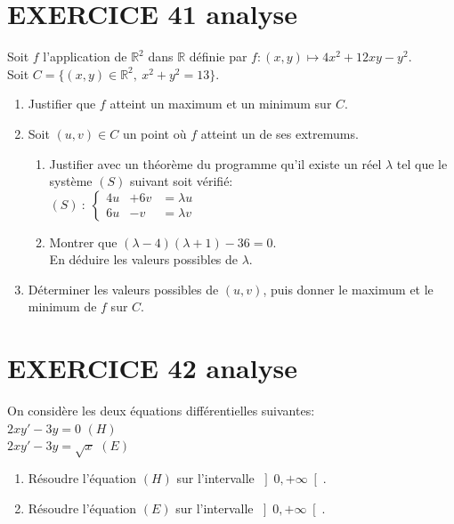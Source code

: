 \documentclass[10pt,oneside]{article}
\begin{document}
\begin{flushleft}
\begin{enumerate}
\end{enumerate}





\section*{EXERCICE 41 \:analyse }

Soit $f$ l'application de $\mathbb{R}^2$ dans $\mathbb{R}$ d\'efinie par $f:(x,y)\mapsto 4x^2+12xy-y^2$. \\
\medskip
Soit $C=\{(x,y)\in\mathbb{R}^2,\ x^2+y^2=13\}$.

\medskip

\begin{enumerate}
\item
Justifier que $f$ atteint un maximum et un minimum sur $C$.
\item
Soit $(u,v)\in C$ un point o\`u $f$ atteint un de ses extremums.
\begin{enumerate}
\item
Justifier avec un th\'eor\`eme du programme qu'il existe un r\'eel $\lambda$ tel que le syst\`eme $(S)$ suivant soit v\'erifi\'e:\\
$(S)\ :\ \left\{\begin{array}{lll}4u&+6v&=\lambda u\\6u&-v&=\lambda v\end{array}\right.$
\item
Montrer que $(\lambda-4)(\lambda+1)-36=0$.\\
 En d\'eduire les valeurs possibles de $\lambda$.
\end{enumerate}
\item
D\'eterminer les valeurs possibles de $(u,v)$, puis donner le maximum et le minimum de $f$ sur $C$.
\end{enumerate}




\section*{EXERCICE 42 \:analyse }


On considère les deux équations différentielles suivantes:\\
$   2xy'-3y=0 $\:\:\:\:\:\:  $(H)$\\
$   2xy'-3y=\sqrt{x} $\:\:\:  $(E)$\\

\begin{enumerate}
\item Résoudre l'équation $(H)$ sur l'intervalle $\left]  0,+\infty\right[ $.
\item Résoudre l'équation $(E)$ sur l'intervalle $\left]  0,+\infty\right[   $.


\end{enumerate}
\end{flushleft}
\end{document}
